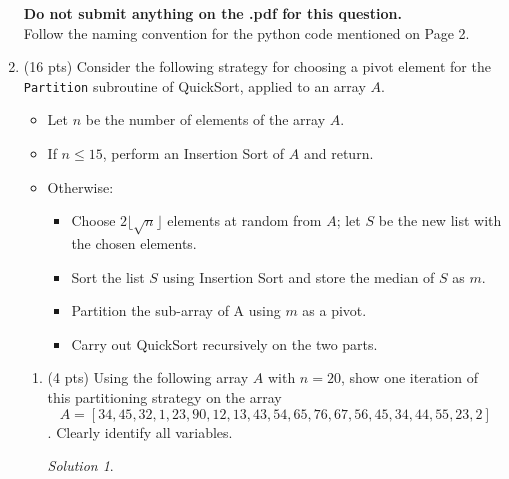 \documentclass[12pt]{article}
\theoremstyle{remark}
\newtheorem*{solution}{Solution}
\begin{document}
\begin{enumerate}
\textbf{Do not submit anything on the .pdf for this question.}\\
Follow the naming convention for the python code mentioned on Page 2.
\pagebreak


\item (16 pts) Consider the following strategy for choosing a pivot element for the {\tt Partition} subroutine of QuickSort, applied to an array $A$.
\begin{itemize}
\item Let $n$ be the number of elements of the array $A$.
\item If $n\leq 15$, perform an Insertion Sort of $A$ and return.
\item Otherwise:
	\begin{itemize}
	\item Choose $2\lfloor \sqrt{n} \rfloor$ elements at random from $A$; let $S$ be the new list with the chosen elements.
	\item Sort the list $S$ using Insertion Sort and store the median of $S$ as $m$.
	\item Partition the sub-array of A using $m$ as a pivot.
	\item Carry out QuickSort recursively on the two parts.
	\end{itemize}
\end{itemize}
\begin{enumerate}
\item (4 pts) Using the following array $A$ with $n=20$, show one iteration of this partitioning strategy on the array $$A=[34, 45, 32, 1, 23, 90, 12, 13, 43, 54, 65, 76, 67, 56, 45, 34, 44, 55, 23, 2]$$. Clearly identify all variables.\\
\begin{solution}

\end{solution}
\end{enumerate}
\end{enumerate}
\end{document}
